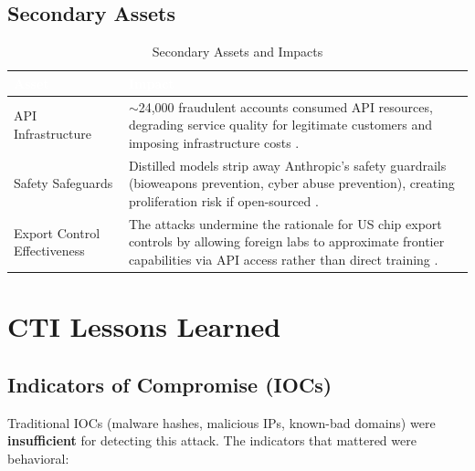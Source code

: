 \documentclass[11pt,a4paper]{article}
\begin{document}
\subsection{Secondary Assets}

\begin{table}[H]
\centering
\renewcommand{\arraystretch}{1.3}
\begin{tabularx}{\textwidth}{|L{4cm}|X|}
\hline
{}
\textcolor{white}{\textbf{Asset}} & \textcolor{white}{\textbf{Impact}} \\
\hline
API Infrastructure & $\sim$24,000 fraudulent accounts consumed API resources, degrading service quality for legitimate customers and imposing infrastructure costs \cite{anthropic_blog}. \\
Safety Safeguards & Distilled models strip away Anthropic's safety guardrails (bioweapons prevention, cyber abuse prevention), creating proliferation risk if open-sourced \cite{anthropic_blog}. \\
Export Control Effectiveness & The attacks undermine the rationale for US chip export controls by allowing foreign labs to approximate frontier capabilities via API access rather than direct training \cite{anthropic_blog}. \\
\hline
\end{tabularx}
\caption{Secondary Assets and Impacts}
\label{tab:secondary_assets}
\end{table}

\newpage

\section{CTI Lessons Learned}

\subsection{Indicators of Compromise (IOCs)}

Traditional IOCs (malware hashes, malicious IPs, known-bad domains) were \textbf{insufficient} for detecting this attack. The indicators that mattered were behavioral:
\end{document}
